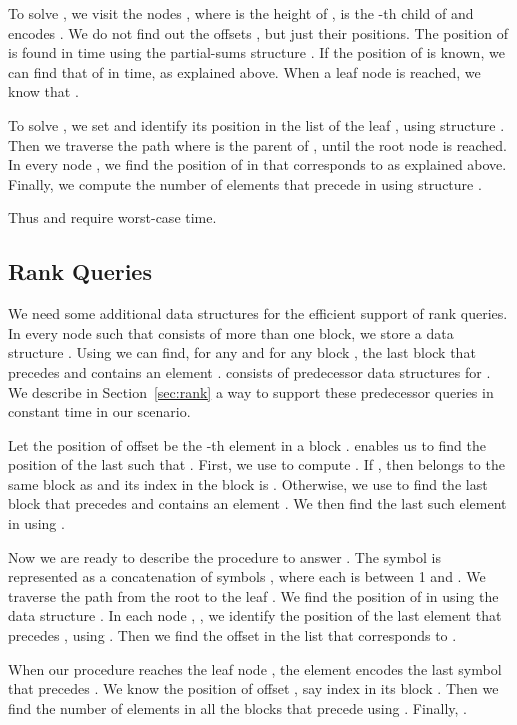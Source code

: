 \documentclass[11pt]{article}
\begin{document}
To solve , we visit the nodes , where 
 is the height of ,
 is the -th child of  and  encodes 
. We do not find out the offsets , but just their
positions. The position of  is found in  
time  using the partial-sums structure . 
If the position of   is known, we can find that of  in 
 time, as explained above. 
When a leaf node  is reached, we know that  .

To solve , we set  and identify its position in the 
list  of the leaf , using structure . 
Then we traverse the path 
 where  is the parent of , until 
the root node is reached. In every node , we find the position of
 in  that corresponds to  as explained above. 
Finally, we compute 
the number of elements that precede  in  using 
structure .  

Thus  and  require 
worst-case time.


\subsection{Rank Queries}

We need some additional data structures for the efficient support of rank queries. 
In every node  such that  consists of more than one block, we store a data structure . Using 
 we can find, for any  and for any block 
, the last block   that precedes  and contains 
an element . 
 consists of  predecessor data structures  for 
. 
We describe in 
Section~\ref{sec:rank} a way to support these predecessor queries in constant 
time in our scenario.

Let the position of offset  be the -th element in a block . 
 enables us to find the position of the last  such that
. First, we use  to compute
. If  , then  belongs to the same 
block as  and its index in the block  is
. Otherwise, we use  to find the 
last block  that precedes  and contains an  element 
. We then find the last such element in 
 using .

Now we are ready to describe the procedure to answer . The symbol 
 is represented as a concatenation of symbols 
, where each  is between 1 and . 
We traverse the path from the root  to the leaf .  
We find the position of  in  using 
the data structure . In each node , , 
 we identify the position of the last element  that precedes 
, using . 
Then we find the offset  in the list  that 
corresponds to .

When our procedure reaches the leaf node , the element  encodes the last 
symbol  that precedes . We know the position of offset , say
index  in its block . Then we find the number  of 
elements in all the blocks that precede  using . 
Finally, .
\end{document}
